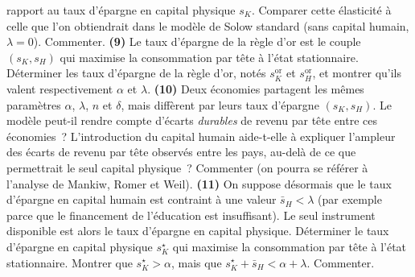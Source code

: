 \documentclass[11pt,a4paper,notitlepage,twocolumn]{article}
\begin{document}
rapport au taux d'épargne en capital physique $s_K$. Comparer cette
élasticité à celle que l'on obtiendrait dans le modèle de Solow
standard (sans capital humain, $\lambda=0$). Commenter. \textbf{(9)}
Le taux d'épargne de la règle d'or est le couple
$(s_K,s_H)$ qui maximise la consommation par tête à l'état
stationnaire. Déterminer les taux d'épargne de la règle d'or, notés
$s_K^{\mathrm{or}}$ et $s_H^{\mathrm{or}}$, et montrer qu'ils valent
respectivement $\alpha$ et $\lambda$. \textbf{(10)} Deux économies
partagent les mêmes paramètres $\alpha$, $\lambda$, $n$ et $\delta$,
mais diffèrent par leurs taux d'épargne $(s_K,s_H)$. Le modèle
peut-il rendre compte d'écarts \emph{durables} de revenu par tête
entre ces économies~? L'introduction du capital humain aide-t-elle à
expliquer l'ampleur des écarts de revenu par tête observés entre les
pays, au-delà de ce que permettrait le seul capital physique~?
Commenter (on pourra se référer à l'analyse de Mankiw, Romer et Weil).
\textbf{(11)} On suppose désormais que le taux d'épargne en capital
humain est contraint à une valeur $\bar s_H<\lambda$ (par exemple
parce que le financement de l'éducation est insuffisant). Le seul
instrument disponible est alors le taux d'épargne en capital physique.
Déterminer le taux d'épargne en capital physique $s_K^{\star}$ qui
maximise la consommation par tête à l'état stationnaire. Montrer que
$s_K^{\star}>\alpha$, mais que
$s_K^{\star}+\bar s_H<\alpha+\lambda$. Commenter.
\end{document}
